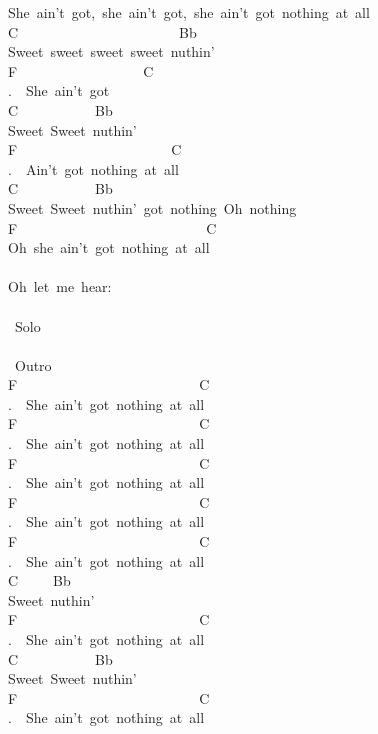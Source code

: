 {She\ ain't\ got,\ she\ ain't\ got,\ she\ ain't\ got\ nothing\ at\ all\\
C\ \ \ \ \ \ \ \ \ \ \ \ \ \ \ \ \ \ \ \ \ \ \ Bb\\
Sweet\ sweet\ sweet\ sweet\ nuthin'\\
F\ \ \ \ \ \ \ \ \ \ \ \ \ \ \ \ \ \ C\\
.\ \ She\ ain't\ got\t\\
C\ \ \ \ \ \ \ \ \ \ \ Bb\\
Sweet\ Sweet\ nuthin'\\
F\ \ \ \ \ \ \ \ \ \ \ \ \ \ \ \ \ \ \ \ \ \ C\\
.\ \ Ain't\ got\ nothing\ at\ all\\
C\ \ \ \ \ \ \ \ \ \ \ Bb\\
Sweet\ Sweet\ nuthin'\ got\ nothing\ Oh\ nothing\\
F\ \ \ \ \ \ \ \ \ \ \ \ \ \ \ \ \ \ \ \ \ \ \ \ \ \ \ C\\
Oh\ she\ ain't\ got\ nothing\ at\ all\\
\\
Oh\ let\ me\ hear:\\
\\
\lbrack\ Solo\rbrack\\
\\
\lbrack\ Outro\rbrack\\
F\ \ \ \ \ \ \ \ \ \ \ \ \ \ \ \ \ \ \ \ \ \ \ \ \ \ C\\
.\ \ She\ ain't\ got\ nothing\ at\ all\\
F\ \ \ \ \ \ \ \ \ \ \ \ \ \ \ \ \ \ \ \ \ \ \ \ \ \ C\\
.\ \ She\ ain't\ got\ nothing\ at\ all\\
F\ \ \ \ \ \ \ \ \ \ \ \ \ \ \ \ \ \ \ \ \ \ \ \ \ \ C\\
.\ \ She\ ain't\ got\ nothing\ at\ all\\
F\ \ \ \ \ \ \ \ \ \ \ \ \ \ \ \ \ \ \ \ \ \ \ \ \ \ C\\
.\ \ She\ ain't\ got\ nothing\ at\ all\\
F\ \ \ \ \ \ \ \ \ \ \ \ \ \ \ \ \ \ \ \ \ \ \ \ \ \ C\\
.\ \ She\ ain't\ got\ nothing\ at\ all\\
C\ \ \ \ \ Bb\\
Sweet\ nuthin'\\
F\ \ \ \ \ \ \ \ \ \ \ \ \ \ \ \ \ \ \ \ \ \ \ \ \ \ C\\
.\ \ She\ ain't\ got\ nothing\ at\ all\\
C\ \ \ \ \ \ \ \ \ \ \ Bb\\
Sweet\ Sweet\ nuthin'\\
F\ \ \ \ \ \ \ \ \ \ \ \ \ \ \ \ \ \ \ \ \ \ \ \ \ \ C\\
.\ \ She\ ain't\ got\ nothing\ at\ all}
